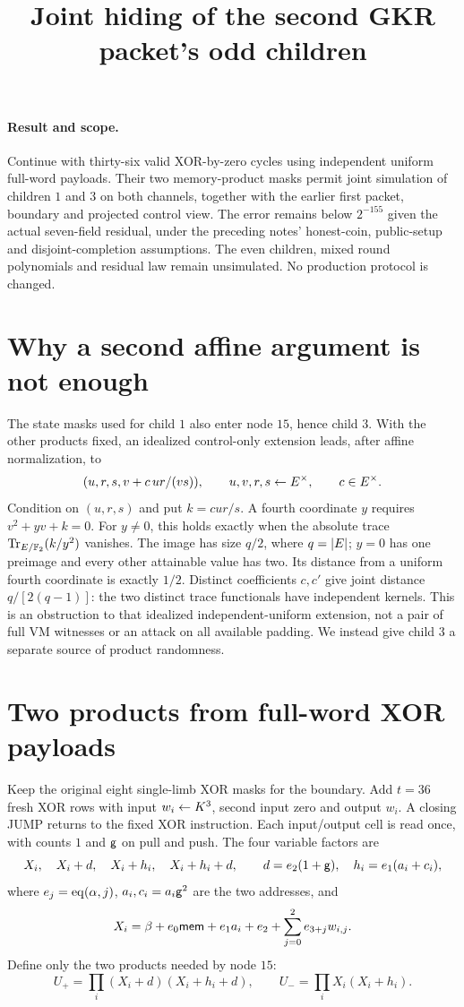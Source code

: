 \documentclass[11pt]{article}
\title{Joint hiding of the second GKR packet's odd children}
\author{}
\date{}
\begin{document}
\maketitle
\vspace{-2em}

\paragraph{Result and scope.} Continue  with thirty-six valid XOR-by-zero cycles using independent uniform full-word payloads. Their two memory-product masks permit joint simulation of children $1$ and $3$ on both channels, together with the earlier first packet, boundary and projected control view. The error remains below $2^{-155}$ given the actual seven-field residual, under the preceding notes' honest-coin, public-setup and disjoint-completion assumptions. The even children, mixed round polynomials and residual law remain unsimulated. No production protocol is changed.

\section{Why a second affine argument is not enough}

The state masks used for child $1$ also enter node $15$, hence child $3$. With the other products fixed, an idealized control-only extension leads, after affine normalization, to
\[
 (u,r,s,v+c\,ur/(vs)),\qquad u,v,r,s\gets E^\times,
 \qquad c\in E^\times.
\]
Condition on $(u,r,s)$ and put $k=cur/s$. A fourth coordinate $y$ requires $v^2+yv+k=0$. For $y\ne0$, this holds exactly when the absolute trace $\operatorname{Tr}_{E/\mathbb{F}_2}(k/y^2)$ vanishes. The image has size $q/2$, where $q=|E|$; $y=0$ has one preimage and every other attainable value has two. Its distance from a uniform fourth coordinate is exactly $1/2$. Distinct coefficients $c,c'$ give joint distance $q/[2(q-1)]$: the two distinct trace functionals have independent kernels. This is an obstruction to that idealized independent-uniform extension, not a pair of full VM witnesses or an attack on all available padding. We instead give child $3$ a separate source of product randomness.

\section{Two products from full-word XOR payloads}

Keep the original eight single-limb XOR masks for the boundary. Add $t=36$ fresh XOR rows with input $w_i\gets K^3$, second input zero and output $w_i$. A closing JUMP returns to the fixed XOR instruction. Each input/output cell is read once, with counts $1$ and $\mathsf{g}$ on pull and push. The four variable factors are
\[
 X_i,\quad X_i+d,\quad X_i+h_i,\quad X_i+h_i+d,
 \qquad d=e_2(1+\mathsf{g}),\quad h_i=e_1(a_i+c_i),
\]
where $e_j=\operatorname{eq}(\alpha,j)$, $a_i,c_i=a_i\mathsf{g}^2$ are the two addresses, and
\[
 X_i=\beta+e_0\mathsf{mem}+e_1a_i+e_2+
       \sum_{j=0}^2e_{3+j}w_{i,j}.
\]
Define only the two products needed by node $15$:
\[
 U_+=\prod_i(X_i+d)(X_i+h_i+d),\qquad
 U_-=\prod_iX_i(X_i+h_i).
\]
\end{document}
